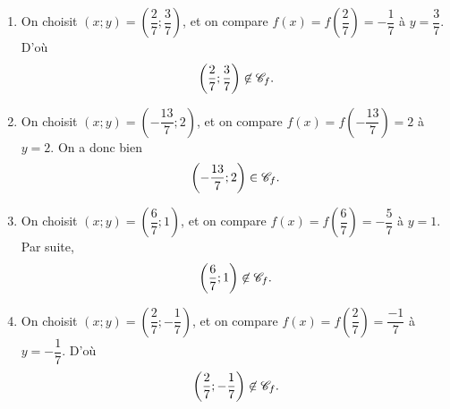 {\begin{enumerate}[label=\roman*)]
			\item On choisit $(x;y) = \left(\dfrac27 ; \dfrac37\right)$, et on compare $f(x) = f\left(\dfrac27\right) = -\dfrac17$ à $y=\dfrac37$. 
			D'où
				\[ \left(\dfrac27 ; \dfrac37\right) \not\in \mathcal{C}_f. \]
				
			\item On choisit $(x;y) = \left(-\dfrac{13}7 ; 2\right)$, et on compare $f(x) = f\left(-\dfrac{13}7\right) = 2$ à $y=2$. 
			On a donc bien
				\[ \left(-\dfrac{13}7 ; 2\right) \in \mathcal{C}_f. \]
			\item On choisit $(x;y) = \left(\dfrac67 ; 1\right)$, et on compare $f(x) = f\left(\dfrac67\right) = -\dfrac57$ à $y=1$. 
			Par suite,
				\[ \left(\dfrac67 ; 1\right) \not\in \mathcal{C}_f. \]
			\item On choisit $(x;y) = \left(\dfrac27 ; -\dfrac17\right)$, et on compare $f(x) = f\left(\dfrac27\right) = \dfrac{-1}7$ à $y=-\dfrac17$. 
			D'où
				\[ \left(\dfrac27 ; -\dfrac17\right) \not\in \mathcal{C}_f. \]
		\end{enumerate}
	
	}

